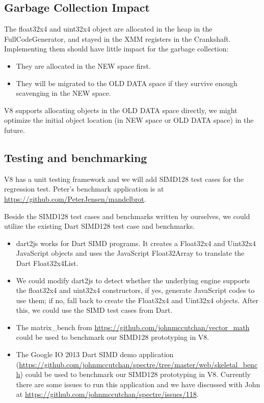 \documentclass[12pt]{article} %
\begin{document}
\subsection{Garbage Collection Impact}
The float32x4 and uint32x4 object are allocated in the heap in the
FullCodeGenerator, and stayed in the XMM registers in the Crankshaft. Implementing them should have little impact for the garbage collection:
\begin{itemize}
  \item They are allocated in the NEW space first.
  \item They will be migrated to the OLD DATA space if they survive enough scavenging in the NEW space.
\end{itemize}
V8 supports allocating objects in the OLD DATA space directly, we might optimize
the initial object location (in NEW space or OLD DATA space) in the future.

\subsection{Testing and benchmarking}
V8 has a unit testing framework and we will add SIMD128 test cases for the
regression test. Peter's benchmark application is at
\url{https://github.com/PeterJensen/mandelbrot}.

Beside the SIMD128 test cases and benchmarks written by ourselves, we could
utilize the existing Dart SIMD128 test case and benchmarks.
\begin{itemize}
  \item dart2js works for Dart SIMD programs. It creates a Float32x4 and Uint32x4 JavaScript objects and uses the JavaScript Float32Array to translate the Dart Float32x4List.
  \item We could modify dart2js to detect whether the underlying engine
supports the float32x4 and uint32x4 constructors, if yes, generate JavaScript
codes to use them; if no, fall back to create the Float32x4 and Uint32x4
objects. After this, we could use the SIMD test cases from Dart.
  \item The matrix\_bench from \url{https://github.com/johnmccutchan/vector\_math} could be used to benchmark our SIMD128 prototyping in V8.
  \item The Google IO 2013 Dart SIMD demo application (\url{https://github.com/johnmccutchan/spectre/tree/master/web/skeletal\_bench}) could be used to benchmark our SIMD128 prototyping in V8. Currently there are some issues to run this application and we have discussed with John at \url{https://github.com/johnmccutchan/spectre/issues/118}.
\end{itemize}
\end{document}
